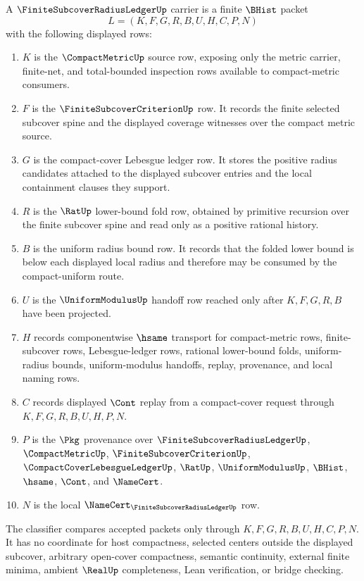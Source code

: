 \begin{definition}
\label{def:finite-subcover-radius-ledger-carrier}
A $\FiniteSubcoverRadiusLedgerUp$ carrier is a finite $\BHist$ packet
$$
L=(K,F,G,R,B,U,H,C,P,N)
$$
with the following displayed rows:
\begin{enumerate}
\item $K$ is the $\CompactMetricUp$ source row, exposing only the metric carrier, finite-net, and total-bounded inspection rows available to compact-metric consumers.
\item $F$ is the $\FiniteSubcoverCriterionUp$ row. It records the finite selected subcover spine and the displayed coverage witnesses over the compact metric source.
\item $G$ is the compact-cover Lebesgue ledger row. It stores the positive radius candidates attached to the displayed subcover entries and the local containment clauses they support.
\item $R$ is the $\RatUp$ lower-bound fold row, obtained by primitive recursion over the finite subcover spine and read only as a positive rational history.
\item $B$ is the uniform radius bound row. It records that the folded lower bound is below each displayed local radius and therefore may be consumed by the compact-uniform route.
\item $U$ is the $\UniformModulusUp$ handoff row reached only after $K,F,G,R,B$ have been projected.
\item $H$ records componentwise $\hsame$ transport for compact-metric rows, finite-subcover rows, Lebesgue-ledger rows, rational lower-bound folds, uniform-radius bounds, uniform-modulus handoffs, replay, provenance, and local naming rows.
\item $C$ records displayed $\Cont$ replay from a compact-cover request through $K,F,G,R,B,U,H,P,N$.
\item $P$ is the $\Pkg$ provenance over $\FiniteSubcoverRadiusLedgerUp$, $\CompactMetricUp$, $\FiniteSubcoverCriterionUp$, $\CompactCoverLebesgueLedgerUp$, $\RatUp$, $\UniformModulusUp$, $\BHist$, $\hsame$, $\Cont$, and $\NameCert$.
\item $N$ is the local $\NameCert_{\FiniteSubcoverRadiusLedgerUp}$ row.
\end{enumerate}
The classifier compares accepted packets only through $K,F,G,R,B,U,H,C,P,N$. It has no coordinate for host compactness, selected centers outside the displayed subcover, arbitrary open-cover compactness, semantic continuity, external finite minima, ambient $\RealUp$ completeness, Lean verification, or bridge checking.
\end{definition}

